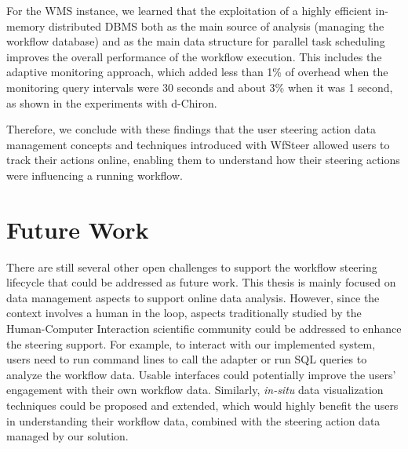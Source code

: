 For the WMS instance, we learned that the exploitation of a highly efficient
in-memory distributed DBMS both as the main source of analysis (managing
the workflow database) and as the main data structure for parallel
task scheduling improves the overall performance of the workflow execution.
This includes the adaptive monitoring approach, which added less than 1\% of overhead when the monitoring query intervals were 30 seconds and about 3\% when it was 1 second, as shown in the experiments with d-Chiron.

Therefore, we conclude with these findings that
the user steering action data management concepts and techniques introduced with WfSteer allowed users to track their actions online, enabling them to understand how their steering actions were influencing a running workflow. 

\section{Future Work}
\label{future}

There are still several other open challenges to support the workflow steering lifecycle that could be addressed as future work.
This thesis is mainly focused on data management aspects to support online data analysis.
However, since the context involves a human in the loop, aspects traditionally studied by
the Human-Computer Interaction scientific community could be addressed to enhance
the steering support. For example, to interact with our implemented system,
users need to run command lines to call the adapter or run SQL queries to analyze
the workflow data. Usable interfaces could potentially improve the users' engagement
with their own workflow data. Similarly, \textit{in-situ} data visualization techniques
\cite{Bauer2016In} could be proposed and extended, which would highly benefit
the users in understanding their workflow data, combined with the steering action data
managed by our solution.

